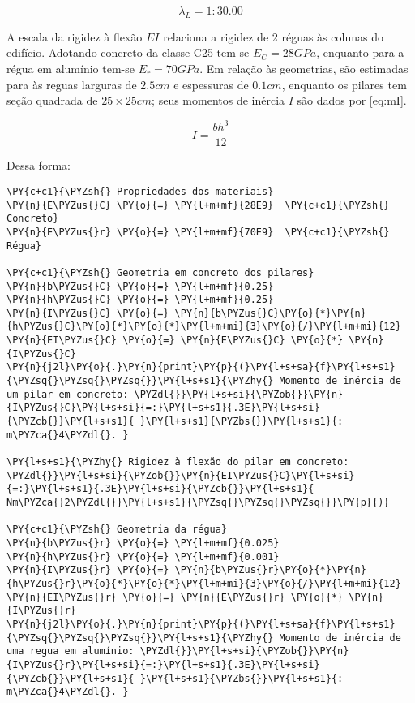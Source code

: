     $$ \lambda_L = 1:30.00 $$

    
    A escala da rigidez à flexão \(EI\) relaciona a rigidez de 2 réguas às
colunas do edifício. Adotando concreto da classe C25 tem-se
\(E_C=28GPa\), enquanto para a régua em alumínio tem-se \(E_{r}=70GPa\).
Em relação às geometrias, são estimadas para às reguas larguras de
\(2.5cm\) e espessuras de \(0.1cm\), enquanto os pilares tem seção
quadrada de \(25 \times 25cm\); seus momentos de inércia \(I\) são dados
por \ref{eq:mI}.

\begin{equation}
\label{eq:mI}
I = \frac{bh^3}{12}
\end{equation}

Dessa forma:

    \begin{tcolorbox}[breakable, size=fbox, boxrule=1pt, pad at break*=1mm,colback=cellbackground, colframe=cellborder]
\begin{Verbatim}[commandchars=\\\{\}]
\PY{c+c1}{\PYZsh{} Propriedades dos materiais}
\PY{n}{E\PYZus{}C} \PY{o}{=} \PY{l+m+mf}{28E9}  \PY{c+c1}{\PYZsh{} Concreto}
\PY{n}{E\PYZus{}r} \PY{o}{=} \PY{l+m+mf}{70E9}  \PY{c+c1}{\PYZsh{} Régua}

\PY{c+c1}{\PYZsh{} Geometria em concreto dos pilares}
\PY{n}{b\PYZus{}C} \PY{o}{=} \PY{l+m+mf}{0.25}
\PY{n}{h\PYZus{}C} \PY{o}{=} \PY{l+m+mf}{0.25}
\PY{n}{I\PYZus{}C} \PY{o}{=} \PY{n}{b\PYZus{}C}\PY{o}{*}\PY{n}{h\PYZus{}C}\PY{o}{*}\PY{o}{*}\PY{l+m+mi}{3}\PY{o}{/}\PY{l+m+mi}{12}
\PY{n}{EI\PYZus{}C} \PY{o}{=} \PY{n}{E\PYZus{}C} \PY{o}{*} \PY{n}{I\PYZus{}C}
\PY{n}{j2l}\PY{o}{.}\PY{n}{print}\PY{p}{(}\PY{l+s+sa}{f}\PY{l+s+s1}{\PYZsq{}\PYZsq{}\PYZsq{}}\PY{l+s+s1}{\PYZhy{} Momento de inércia de um pilar em concreto: \PYZdl{}}\PY{l+s+si}{\PYZob{}}\PY{n}{I\PYZus{}C}\PY{l+s+si}{=:}\PY{l+s+s1}{.3E}\PY{l+s+si}{\PYZcb{}}\PY{l+s+s1}{ }\PY{l+s+s1}{\PYZbs{}}\PY{l+s+s1}{: m\PYZca{}4\PYZdl{}. }

\PY{l+s+s1}{\PYZhy{} Rigidez à flexão do pilar em concreto: \PYZdl{}}\PY{l+s+si}{\PYZob{}}\PY{n}{EI\PYZus{}C}\PY{l+s+si}{=:}\PY{l+s+s1}{.3E}\PY{l+s+si}{\PYZcb{}}\PY{l+s+s1}{ Nm\PYZca{}2\PYZdl{}}\PY{l+s+s1}{\PYZsq{}\PYZsq{}\PYZsq{}}\PY{p}{)}

\PY{c+c1}{\PYZsh{} Geometria da régua}
\PY{n}{b\PYZus{}r} \PY{o}{=} \PY{l+m+mf}{0.025}
\PY{n}{h\PYZus{}r} \PY{o}{=} \PY{l+m+mf}{0.001}
\PY{n}{I\PYZus{}r} \PY{o}{=} \PY{n}{b\PYZus{}r}\PY{o}{*}\PY{n}{h\PYZus{}r}\PY{o}{*}\PY{o}{*}\PY{l+m+mi}{3}\PY{o}{/}\PY{l+m+mi}{12}
\PY{n}{EI\PYZus{}r} \PY{o}{=} \PY{n}{E\PYZus{}r} \PY{o}{*} \PY{n}{I\PYZus{}r} 
\PY{n}{j2l}\PY{o}{.}\PY{n}{print}\PY{p}{(}\PY{l+s+sa}{f}\PY{l+s+s1}{\PYZsq{}\PYZsq{}\PYZsq{}}\PY{l+s+s1}{\PYZhy{} Momento de inércia de uma regua em alumínio: \PYZdl{}}\PY{l+s+si}{\PYZob{}}\PY{n}{I\PYZus{}r}\PY{l+s+si}{=:}\PY{l+s+s1}{.3E}\PY{l+s+si}{\PYZcb{}}\PY{l+s+s1}{ }\PY{l+s+s1}{\PYZbs{}}\PY{l+s+s1}{: m\PYZca{}4\PYZdl{}. }


\end{Verbatim}
\end{tcolorbox}
